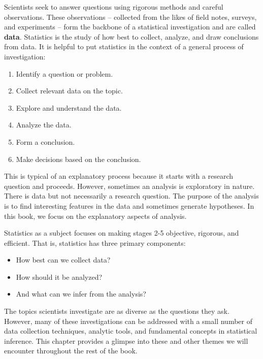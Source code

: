 \documentclass[
  letterpaper,
  DIV=11,
  numbers=noendperiod]{scrreprt}
\providecommand{\tightlist}{%
  \setlength{\itemsep}{0pt}\setlength{\parskip}{0pt}}\usepackage{longtable,booktabs,array}
\begin{document}
Scientists seek to answer questions using rigorous methods and careful
observations. These observations -- collected from the likes of field
notes, surveys, and experiments -- form the backbone of a statistical
investigation and are called \textbf{data}. Statistics is the study of
how best to collect, analyze, and draw conclusions from data. It is
helpful to put statistics in the context of a general process of
investigation:

\begin{enumerate}
\def\labelenumi{\arabic{enumi}.}
\item
  Identify a question or problem.
\item
  Collect relevant data on the topic.
\item
  Explore and understand the data.
\item
  Analyze the data.
\item
  Form a conclusion.
\item
  Make decisions based on the conclusion.
\end{enumerate}

This is typical of an explanatory process because it starts with a
research question and proceeds. However, sometimes an analysis is
exploratory in nature. There is data but not necessarily a research
question. The purpose of the analysis is to find interesting features in
the data and sometimes generate hypotheses. In this book, we focus on
the explanatory aspects of analysis.

Statistics as a subject focuses on making stages 2-5 objective,
rigorous, and efficient. That is, statistics has three primary
components:

\begin{itemize}
\tightlist
\item
  How best can we collect data?\\
\item
  How should it be analyzed?\\
\item
  And what can we infer from the analysis?
\end{itemize}

The topics scientists investigate are as diverse as the questions they
ask. However, many of these investigations can be addressed with a small
number of data collection techniques, analytic tools, and fundamental
concepts in statistical inference. This chapter provides a glimpse into
these and other themes we will encounter throughout the rest of the
book.
\end{document}
